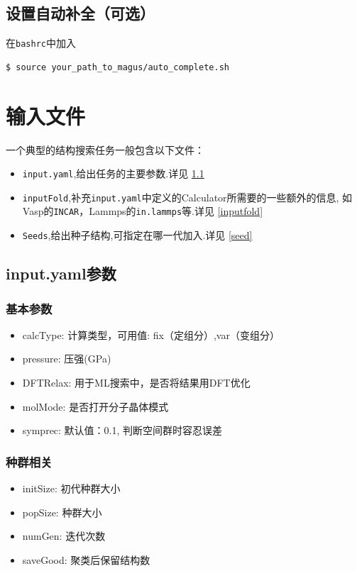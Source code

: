 \documentclass[12pt]{article}
\newcommand{\file}[1]{\texttt{#1}}
\begin{document}
\subsection{设置自动补全（可选）}
在\file{bashrc}中加入
\begin{tcolorbox}
    \begin{verbatim}
$ source your_path_to_magus/auto_complete.sh
    \end{verbatim}
\end{tcolorbox}
\newpage
\section{输入文件}
一个典型的结构搜索任务一般包含以下文件：
\begin{itemize}
    \item \file{input.yaml},给出任务的主要参数.详见 \ref{inputpara}
    \item \file{inputFold},补充\file{input.yaml}中定义的Calculator所需要的一些额外的信息,
    如Vasp的\file{INCAR}，Lammps的\file{in.lammps}等.详见 \ref{inputfold}
    \item \file{Seeds},给出种子结构,可指定在哪一代加入.详见 \ref{seed}
\end{itemize}
\subsection{input.yaml参数} \label{inputpara}

\subsubsection{基本参数}
\begin{itemize}
    \item calcType: 计算类型，可用值:  fix（定组分）,var（变组分）
    \item pressure: 压强(GPa)
    \item DFTRelax: 用于ML搜索中，是否将结果用DFT优化
    \item molMode: 是否打开分子晶体模式
    \item symprec: 默认值：0.1, 判断空间群时容忍误差
\end{itemize}

\subsubsection{种群相关}
\begin{itemize}
    \item initSize: 初代种群大小
    \item popSize: 种群大小
    \item numGen: 迭代次数
    \item saveGood: 聚类后保留结构数
\end{itemize}
\end{document}
